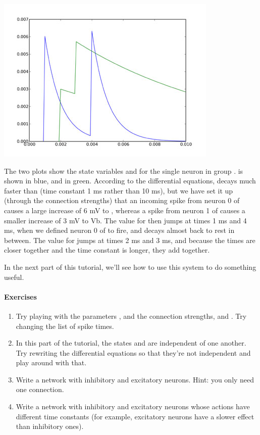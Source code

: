 \documentclass[letterpaper,10pt]{manual}
\begin{document}
\includegraphics{2a.jpg}

The two plots show the state variables  and  for the single
neuron in group .  is shown in blue, and  in green.
According to the differential equations,  decays much faster
than  (time constant 1 ms rather than 10 ms), but we have set
it up (through the connection strengths) that an incoming
spike from neuron 0 of  causes a large increase of 6 mV to ,
whereas a spike from neuron 1 of  causes a smaller increase of
3 mV to Vb. The value for  then jumps at times 1 ms and 4 ms,
when we defined neuron 0 of  to fire, and decays almost back
to rest in between. The value for  jumps at times 2 ms and
3 ms, and because the times are closer together and the time
constant is longer, they add together.

In the next part of this tutorial, we'll see how to use this
system to do something useful.


\paragraph{Exercises}
\begin{enumerate}
\item {} 
Try playing with the parameters ,  and the connection
strengths,  and . Try changing the list of
spike times.

\item {} 
In this part of the tutorial, the states  and  are
independent of one another. Try rewriting the differential
equations so that they're not independent and play around
with that.

\item {} 
Write a network with inhibitory and excitatory neurons. Hint: you
only need one connection.

\item {} 
Write a network with inhibitory and excitatory neurons whose
actions have different time constants (for example, excitatory
neurons have a slower effect than inhibitory ones).

\end{enumerate}
\end{document}
